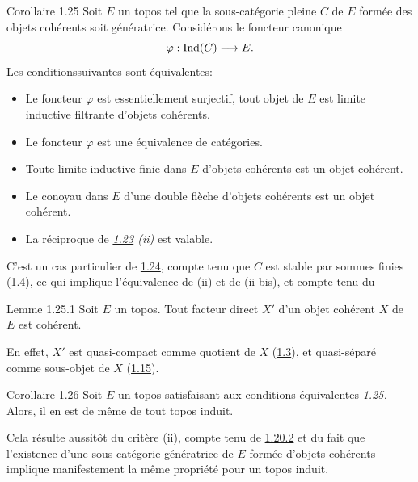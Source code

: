 \documentclass[10pt]{../fichiers-configuration-latex/smfart}
\begin{document}
\begin{enonce*}{Corollaire 1.25}
Soit $E$ un topos tel que la sous-catégorie pleine $C$ de $E$ formée
des objets cohérents soit génératrice. Considérons le foncteur
canonique
$$
\varphi : \Ind(C) \to E{\quoi}.
$$
Les conditions\pageoriginale suivantes sont équivalentes:
\begin{itemize}
\item[(i)] Le foncteur $\varphi$ est essentiellement surjectif, \ie tout
  objet de $E$ est limite inductive filtrante d'objets cohérents.

\item[(i bis)] Le foncteur $\varphi$ est une équivalence de catégories.

\item[(ii)] Toute limite inductive finie dans $E$ d'objets cohérents est
  un objet cohérent.

\item[(ii bis)] Le conoyau dans $E$ d'une double flèche d'objets
  cohérents est un objet cohérent.

\item[(iii)] La réciproque de \emph{\hyperref[VI.thm1.23]{1.23} (ii)} est valable.
\end{itemize}
\end{enonce*}

C'est un cas particulier de \hyperref[VI.cor1.24]{1.24}, compte tenu que $C$ est stable par
sommes finies (\hyperref[VI.cor1.4]{1.4}), ce qui implique l'équivalence de (ii) et de (ii
bis), et compte tenu du

\begin{enonce*}{Lemme 1.25.1}
Soit $E$ un topos. Tout facteur direct $X'$ d'un objet cohérent $X$ de
$E$ est cohérent.
\end{enonce*}

En effet, $X'$ est quasi-compact comme quotient de $X$ (\hyperref[VI.prop1.3]{1.3}), et
quasi-séparé comme sous-objet de $X$ (\hyperref[VI.cor1.15]{1.15}).

\begin{enonce*}{Corollaire 1.26}
Soit $E$ un topos satisfaisant aux conditions équivalentes
\emph{\hyperref[VI.cor1.25]{1.25}.} Alors, il en est de même de tout topos induit.
\end{enonce*}

Cela résulte aussitôt du critère (ii), compte tenu de \hyperref[VI.subsubsec1.20.2]{1.20.2} et du
fait que l'existence d'une sous-catégorie génératrice de $E$ formée
d'objets cohérents implique manifestement la même propriété pour un
topos induit.
\end{document}
